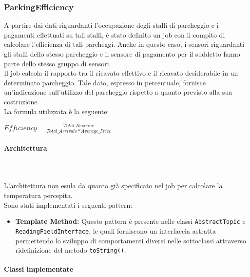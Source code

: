 \documentclass[8pt]{article}
\newcommand{\subsubsubsection}[1]{\paragraph{#1}\mbox{}\\\\}
\begin{document}
\subsubsection{ParkingEfficiency}
A partire dai dati riguardanti l'occupazione degli stalli di parcheggio e i pagamenti effettuati su tali stalli, è stato definito un job con il compito di calcolare l'efficienza di tali parcheggi. Anche in questo caso, i sensori riguardanti gli stalli dello stesso parcheggio e il sensore di pagamento per il suddetto fanno parte dello stesso gruppo di sensori.
\\Il job calcola il rapporto tra il ricavato effettivo e il ricavato desiderabile in un determinato parcheggio. Tale dato, espresso in percentuale, fornisce un'indicazione sull'utilizzo del parcheggio rispetto a quanto previsto alla sua costruzione.\\La formula utilizzata è la seguente:
\begin{center}
    $Efficiency = \frac{Total\_Revenue}{Total\_Arrivals * Average\_Price}$
\end{center}
\subsubsubsection{Architettura}
L'architettura non esula da quanto già specificato nel job per calcolare la temperatura percepita.
\\Sono stati implementati i seguenti pattern:
\begin{itemize}
    \item \textbf{Template Method:}
    Questo pattern è presente nelle classi \verb|AbstractTopic| e \verb|ReadingFieldInterface|, le quali forniscono un interfaccia astratta permettendo lo sviluppo di comportamenti diversi nelle sottoclassi attraverso ridefinizione del metodo \verb|toString()|.
\end{itemize}
\subsubsubsection{Classi implementate}
\end{document}
